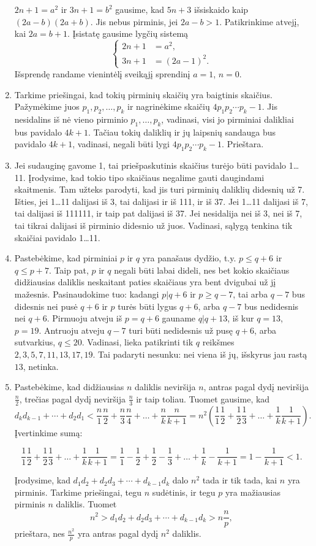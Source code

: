 \begin{enumerate}
$2n+1 = a^2$ ir $3n+1 = b^2$ gausime, kad $5n+3$ išsiskaido kaip
$(2a-b)(2a+b)$. Jis nebus pirminis, jei $2a-b >1$. Patikrinkime
atvejį, kai $2a = b+1$. Įsistatę gausime lygčių sistemą
$$\begin{cases}
  2n+1 & = a^2, \\
  3n+1 & = (2a-1)^2.
  \end{cases}$$ 
Išsprendę randame vienintėlį sveikąjį sprendinį $a=1$, $n=0$.
\item 
Tarkime priešingai, kad tokių pirminių skaičių yra baigtinis skaičius.
Pažymėkime juos $p_1, p_2, \ldots, p_k$ ir nagrinėkime skaičių $4p_1p_2\cdots
p_k - 1$. Jis nesidalins iš nė vieno pirminio $p_1, \ldots, p_k$,
vadinasi, visi jo pirminiai dalikliai bus pavidalo $4k+1$. Tačiau tokių
daliklių ir jų laipsnių sandauga bus pavidalo $4k+1$, vadinasi, negali
būti lygi $4p_1p_2\cdots p_k - 1$. Prieštara.
\item 
Jei sudauginę gavome 1, tai priešpaskutinis skaičius turėjo būti
pavidalo 1\dots11.  Įrodysime, kad tokio tipo skaičiaus negalime gauti
daugindami skaitmenis. Tam užteks parodyti, kad jis turi pirminių
daliklių didesnių už 7. Išties, jei 1\dots11 dalijasi iš 3, tai
dalijasi ir iš 111, ir iš 37. Jei 1\dots11 dalijasi iš 7, tai dalijasi
iš 111111, ir taip pat dalijasi iš 37. Jei nesidalija nei iš 3, nei iš
7, tai tikrai dalijasi iš pirminio didesnio už juos. Vadinasi, sąlygą
tenkina tik skaičiai pavidalo 1\dots11.
\item 
Pastebėkime, kad pirminiai $p$ ir $q$ yra panašaus dydžio, t.y.
$p\leq q+6$ ir $q\leq p+7$. Taip pat, $p$ ir $q$ negali būti labai
dideli, nes bet kokio skaičiaus didžiausias daliklis neskaitant paties
skaičiaus yra bent dvigubai už jį mažesnis. Pasinaudokime tuo: kadangi $p|q+6$ ir
$p\geq q-7$, tai arba $q-7$ bus didesnis nei pusė $q+6$ ir $p$ turės
būti lygus $q+6$, arba $q-7$ bus nedidesnis nei $q+6$. Pirmuoju atveju
iš $p=q+6$ gauname $q|q+13$, iš kur $q=13$, $p=19$. Antruoju atveju
$q-7$ turi būti nedidesnis už pusę $q+6$, arba sutvarkius, $q\leq 20$.
Vadinasi, lieka patikrinti tik $q$ reikšmes $2,3,5,7,11,13,17,19$. Tai
padaryti nesunku: nei viena iš jų, išskyrus jau rastą $13$, netinka.
\item 
Pastebėkime, kad didžiausias $n$ daliklis neviršija $n$, antras pagal
dydį neviršija $\frac{n}{2}$, trečias pagal dydį neviršija
$\frac{n}{3}$ ir taip toliau. Tuomet gausime, kad $$d_k d_{k-1} +
\cdots + d_{2}d_{1} < \frac{n}{1}\frac{n}{2} + \frac{n}{3}\frac{n}{4}
+ \dots + \frac{n}{k}\frac{n}{k+1} = n^2(\frac{1}{1}\frac{1}{2} +
\frac{1}{2}\frac{1}{3} + \dots + \frac{1}{k}\frac{1}{k+1}).$$
Įvertinkime sumą:

$$\frac{1}{1}\frac{1}{2} + \frac{1}{2}\frac{1}{3} + \dots +
\frac{1}{k}\frac{1}{k+1} = \frac{1}{1} - \frac{1}{2} + \frac{1}{2}
-\frac{1}{3} + \dots + \frac{1}{k} -\frac{1}{k+1} = 1 -
\frac{1}{k+1} < 1.$$

Įrodysime, kad $d_1 d_2 + d_2 d_3 + \cdots + d_{k-1}d_{k}$ dalo
$n^2$ tada ir tik tada, kai $n$ yra pirminis. Tarkime priešingai, tegu
$n$ sudėtinis, ir tegu $p$ yra mažiausias pirminis $n$ daliklis.
Tuomet $$n^2 > d_1 d_2 + d_2 d_3 + \cdots + d_{k-1}d_{k} >
n\frac{n}{p},$$ prieštara, nes $\frac{n^2}{p}$ yra antras pagal dydį
$n^2$ daliklis.
\end{enumerate} 
